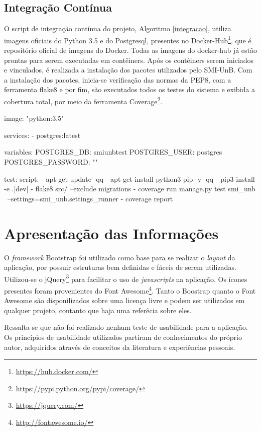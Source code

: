 \subsection{Integração Contínua}
O script de integração contínua do projeto, Algoritmo \ref{integracao}, utiliza imagens oficiais do Python 3.5 e do Postgresql, presentes no Docker-Hub\footnote{\url{https://hub.docker.com/}}, que é repositório oficial de imagens do Docker. Todas as imagens do docker-hub já estão prontas para serem executadas em contêiners. Após os contêiners serem iniciados e vinculados, é realizada a instalação dos pacotes utilizados pelo SMI-UnB. Com a instalação dos pacotes, inicia-se verificação das normas da PEP8, com a ferramenta flake8 e por fim, são executados todos os testes do sistema e exibida a cobertura total, por meio da ferramenta Coverage\footnote{\url{https://pypi.python.org/pypi/coverage/}}.

\begin{python}[caption={\textit{Script} para integração contínua do projeto.}, captionpos=b, label={integracao}]
image: "python:3.5"

services:
  - postgres:latest

variables:
  POSTGRES_DB: smiunbtest
  POSTGRES_USER: postgres
  POSTGRES_PASSWORD: ""

test:
    script:
        - apt-get update -qq
        - apt-get install python3-pip -y -qq
        - pip3 install -e .[dev]
        - flake8 src/ --exclude migrations
        - coverage run manage.py test smi_unb \
          --settings=smi_unb.settings_runner
        - coverage report
\end{python}

\section{Apresentação das Informações}
O \textit{framework} Bootstrap foi utilizado como base para se realizar o \textit{layout} da aplicação, por possuir estruturas bem definidas e fáceis de serem utilizadas. Utilizou-se o jQuery\footnote{\url{https://jquery.com/}} para facilitar o uso de \textit{javascripts} na aplicação. Os ícones presentes foram provenientes do Font Awesome\footnote{\url{http://fontawesome.io/}}. Tanto o Boostrap quanto o Font Awesome são disponilizados sobre uma licença livre e podem ser utilizados em qualquer projeto, contanto que haja uma referêcia sobre eles.

Ressalta-se que não foi realizado nenhum teste de usabilidade para a aplicação. Os princípios de usabilidade utilizados partiram de conhecimentos do próprio autor, adquiridos através de conceitos da literatura e experiências pessoais.

